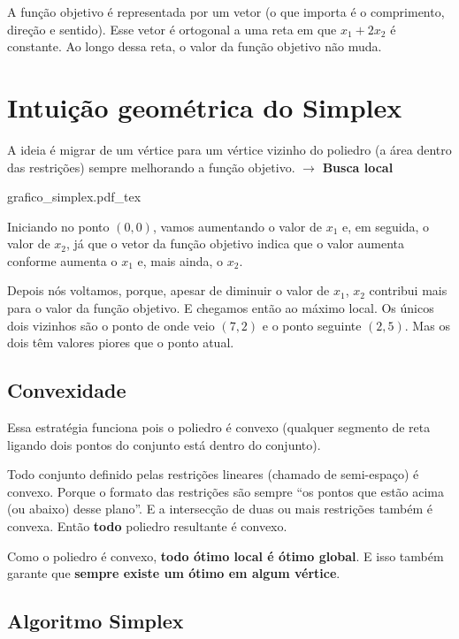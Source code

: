 A função objetivo é representada por um vetor (o que importa é o comprimento, direção e sentido). Esse vetor é ortogonal a uma reta em que $x_1 + 2x_2$ é constante. Ao longo dessa  reta, o valor da função objetivo não muda.

\section{Intuição geométrica do Simplex}

A ideia é migrar de um vértice para um vértice vizinho do poliedro (a área dentro das restrições) sempre melhorando a função objetivo. $\to$ \textbf{Busca local}

\begin{example}
    \begin{center}
        \def\svgwidth{.75\linewidth}
        {grafico_simplex.pdf_tex}
    \end{center}
\end{example}

Iniciando no ponto $(0, 0)$, vamos aumentando o valor de $x_1$ e, em seguida, o valor de $x_2$, já que o vetor da função objetivo indica que o valor aumenta conforme aumenta o $x_1$ e, mais ainda, o $x_2$.

Depois nós voltamos, porque, apesar de diminuir o valor de $x_1$, $x_2$ contribui mais para o valor da função objetivo. E chegamos então ao máximo local. Os únicos dois vizinhos são o ponto de onde veio $(7, 2)$ e o ponto seguinte $(2, 5)$. Mas os dois têm valores piores que o ponto atual.

\subsection{Convexidade}

Essa estratégia funciona pois o poliedro é convexo (qualquer segmento de reta ligando dois pontos do conjunto está dentro do conjunto).

Todo conjunto definido pelas restrições lineares (chamado de semi-espaço) é convexo. Porque o formato das restrições são sempre ``os pontos que estão acima (ou abaixo) desse plano''. E a intersecção de duas ou mais restrições também é convexa. Então \textbf{todo} poliedro resultante é convexo.

Como o poliedro é convexo, \textbf{todo ótimo local é ótimo global}. E isso também garante que \textbf{sempre existe um ótimo em algum vértice}.

\subsection{Algoritmo Simplex}

